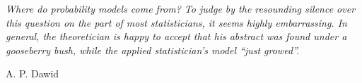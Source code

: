 \documentclass[\ifafour a4paper,12pt,\else a5paper,10pt,\fi%
onecolumn,oneside,article,%
british%
]{memoir}
\title{\propertitle}
\author{%
\hspace*{\stretch{1}}%
\parbox{0.5\linewidth}%
{\protect\centering P.G.L.  Porta Mana\\%
\footnotesize\epost{\email{pgl}{portamana.org}}}%
\hspace*{\stretch{1}}%
}
\date{\firstpublished; updated \updated}
\theoremstyle{remark}
\theoremstyle{innote}
\newcommand*{\asudedication}[1]{%
{\par\centering\textit{#1}\par}}
\renewcommand*{\|}[1][]{\nonscript\,#1\vert\nonscript\;\mathopen{}}
\newcommand*{\sect}{\S}%
\begin{document}
\captiondelim{\quad}\captionnamefont{\footnotesize}\captiontitlefont{\footnotesize}
\frenchspacing
\maketitle

\abstractrunin
\abslabeldelim{}
\renewcommand*{\abstractname}{}
\setlength{\absleftindent}{0pt}
\setlength{\absrightindent}{0pt}
\setlength{\abstitleskip}{-\absparindent}
\begin{abstract}%
  \noindent An explanation of generalized linear models
\\\noindent\emph{\footnotesize Note: Dear Reader, please remember that
  you're the ultimate peer-reviewer of anything you read.}
\end{abstract}
\frenchspacing

\setlength{\epigraphwidth}{.53\columnwidth}
\epigraphfontsize{\footnotesize}
\setlength{\epigraphrule}{0pt}
\epigraph{\emph{Where do probability models come from? To judge by the
    resounding silence over this question on the part of most
    statisticians, it seems highly embarrassing. In general, the
    theoretician is happy to accept that his abstract
    was found under a gooseberry bush, while the applied statistician's
    model ``just growed''.} }{A. P. Dawid \parencites*[\sect~4,
  p.~220]{dawid1982}}



\end{document}
